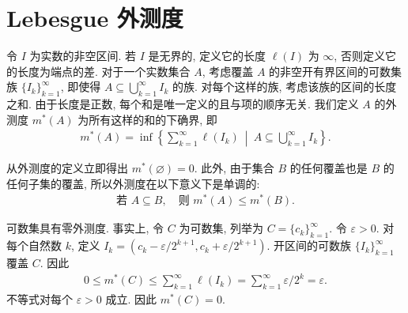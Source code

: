 \documentclass[../../main.tex]{subfiles}
\begin{document}
\section{Lebesgue 外测度}\label{section:ch02-外测度}

令 $I$ 为实数的非空区间. 若 $I$ 是无界的, 定义它的长度 $\ell(I)$ 为 $\infty$, 否则定义它的长度为端点的差. 对于一个实数集合 $A$, 考虑覆盖 $A$ 的非空开有界区间的可数集族 $\{I_{k}\}_{k=1}^{\infty}$, 即使得 $A\subseteq\bigcup_{k=1}^{\infty}I_{k}$ 的族. 对每个这样的族, 考虑该族的区间的长度之和. 由于长度是正数, 每个和是唯一定义的且与项的顺序无关. 我们定义 $A$ 的外测度 $m^{*}(A)$ 为所有这样的和的下确界, 即
\begin{align}
m^{*}(A)=\inf\left\{\sum_{k=1}^{\infty}\ell(I_{k})\ \middle|\ A\subseteq\bigcup_{k=1}^{\infty}I_{k}\right\}.\label{align:ch02-外测度定义}
\end{align}

从外测度的定义立即得出 $m^{*}(\varnothing)=0$. 此外, 由于集合 $B$ 的任何覆盖也是 $B$ 的任何子集的覆盖, 所以外测度在以下意义下是单调的:
\begin{align*}
\text{若 }A\subseteq B,\quad\text{则 }m^{*}(A)\leqslant m^{*}(B).
\end{align*}

\begin{example}\label{example:ch02-可数集零外测度}
可数集具有零外测度. 事实上, 令 $C$ 为可数集, 列举为 $C=\{c_{k}\}_{k=1}^{\infty}$. 令 $\varepsilon>0$. 对每个自然数 $k$, 定义 $I_{k}=(c_{k}-\varepsilon/2^{k+1},c_{k}+\varepsilon/2^{k+1})$. 开区间的可数族 $\{I_{k}\}_{k=1}^{\infty}$ 覆盖 $C$. 因此
\begin{align*}
0\leqslant m^{*}(C)\leqslant\sum_{k=1}^{\infty}\ell(I_{k})=\sum_{k=1}^{\infty}\varepsilon/2^{k}=\varepsilon.
\end{align*}
不等式对每个 $\varepsilon>0$ 成立. 因此 $m^{*}(C)=0$.
\end{example}

\begin{proposition}[区间的外测度是它的长度]\label{proposition:ch02-区间外测度}
\end{proposition}
\end{document}
